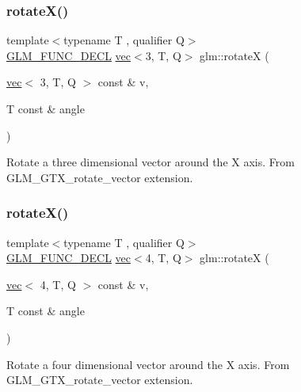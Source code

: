 \subsubsection{\texorpdfstring{rotate\+X()}{rotateX()}\hspace{0.1cm}{\footnotesize\ttfamily [1/2]}}
{\footnotesize\ttfamily template$<$typename T , qualifier Q$>$ \\
\hyperlink{setup_8hpp_ab2d052de21a70539923e9bcbf6e83a51}{G\+L\+M\+\_\+\+F\+U\+N\+C\+\_\+\+D\+E\+CL} \hyperlink{structglm_1_1vec}{vec}$<$3, T, Q$>$ glm\+::rotateX (\begin{DoxyParamCaption}\item[{\hyperlink{structglm_1_1vec}{vec}$<$ 3, T, Q $>$ const \&}]{v,  }\item[{T const \&}]{angle }\end{DoxyParamCaption})}

Rotate a three dimensional vector around the X axis. From G\+L\+M\+\_\+\+G\+T\+X\+\_\+rotate\+\_\+vector extension. \mbox{\label{group__gtx__rotate__vector_ga4333b1ea8ebf1bd52bc3801a7617398a}} 
\subsubsection{\texorpdfstring{rotate\+X()}{rotateX()}\hspace{0.1cm}{\footnotesize\ttfamily [2/2]}}
{\footnotesize\ttfamily template$<$typename T , qualifier Q$>$ \\
\hyperlink{setup_8hpp_ab2d052de21a70539923e9bcbf6e83a51}{G\+L\+M\+\_\+\+F\+U\+N\+C\+\_\+\+D\+E\+CL} \hyperlink{structglm_1_1vec}{vec}$<$4, T, Q$>$ glm\+::rotateX (\begin{DoxyParamCaption}\item[{\hyperlink{structglm_1_1vec}{vec}$<$ 4, T, Q $>$ const \&}]{v,  }\item[{T const \&}]{angle }\end{DoxyParamCaption})}

Rotate a four dimensional vector around the X axis. From G\+L\+M\+\_\+\+G\+T\+X\+\_\+rotate\+\_\+vector extension. \mbox{\label{group__gtx__rotate__vector_gaebdc8b054ace27d9f62e054531c6f44d}} 
